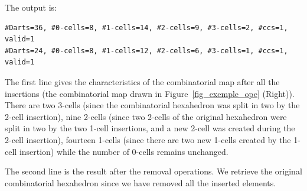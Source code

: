 The output is:
\begin{verbatim}
#Darts=36, #0-cells=8, #1-cells=14, #2-cells=9, #3-cells=2, #ccs=1, valid=1
#Darts=24, #0-cells=8, #1-cells=12, #2-cells=6, #3-cells=1, #ccs=1, valid=1
\end{verbatim}

The first line gives the characteristics of the combinatorial map
after all the insertions (the combinatorial map drawn in
Figure~\ref{fig_exemple_ope} (Right)). There are two 3-cells (since
the combinatorial hexahedron was split in two by the 2-cell
insertion), nine 2-cells (since two 2-cells of the original hexahedron
were split in two by the two 1-cell insertions, and a new 2-cell was
created during the 2-cell insertion), fourteen 1-cells (since there
are two new 1-cells created by the 1-cell insertion) while the number
of 0-cells remains unchanged.

The second line is the result after the removal operations. We
retrieve the original combinatorial hexahedron since we have removed
all the inserted elements.

